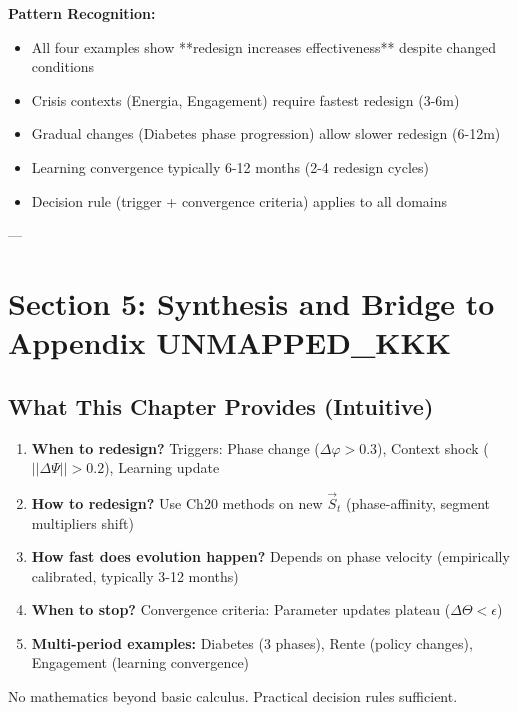 \textbf{Pattern Recognition:}
\begin{itemize}[nosep]
\item All four examples show **redesign increases effectiveness** despite changed conditions
\item Crisis contexts (Energia, Engagement) require fastest redesign (3-6m)
\item Gradual changes (Diabetes phase progression) allow slower redesign (6-12m)
\item Learning convergence typically 6-12 months (2-4 redesign cycles)
\item Decision rule (trigger + convergence criteria) applies to all domains
\end{itemize}

---

\section{Section 5: Synthesis and Bridge to Appendix UNMAPPED_KKK}
\label{sec:21-synthesis}

\subsection{What This Chapter Provides (Intuitive)}

\begin{tcolorbox}[colback=green!5!white, colframe=green!75!black, title=What Ch21 Answers for Practitioners]

\begin{enumerate}
\item \textbf{When to redesign?} Triggers: Phase change ($\Delta \varphi > 0.3$), Context shock ($||\Delta \Psi|| > 0.2$), Learning update
\item \textbf{How to redesign?} Use Ch20 methods on new $\vec{S}_t$ (phase-affinity, segment multipliers shift)
\item \textbf{How fast does evolution happen?} Depends on phase velocity (empirically calibrated, typically 3-12 months)
\item \textbf{When to stop?} Convergence criteria: Parameter updates plateau ($\Delta \Theta < \epsilon$)
\item \textbf{Multi-period examples:} Diabetes (3 phases), Rente (policy changes), Engagement (learning convergence)
\end{enumerate}

No mathematics beyond basic calculus. Practical decision rules sufficient.

\end{tcolorbox}

